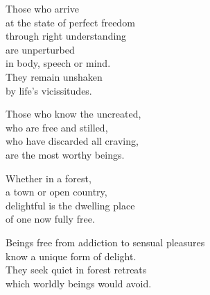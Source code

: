 Those who arrive\\
at the state of perfect freedom\\
through right understanding\\
are unperturbed\\
in body, speech or mind.\\
They remain unshaken\\
by life's vicissitudes.


Those who know the uncreated,\\
who are free and stilled,\\
who have discarded all craving,\\
are the most worthy beings.


Whether in a forest,\\
a town or open country,\\
delightful is the dwelling place\\
of one now fully free.


Beings free from addiction to sensual pleasures\\
know a unique form of delight.\\
They seek quiet in forest retreats\\
which worldly beings would avoid.

